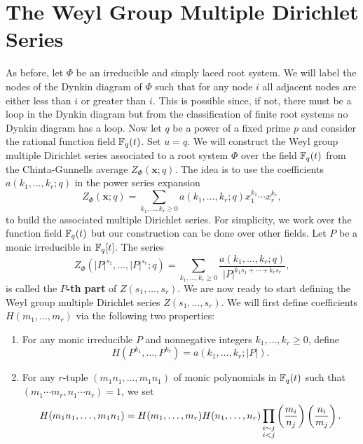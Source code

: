 \documentclass[12pt,reqno,oneside]{amsart}
\begin{document}
\section{The Weyl Group Multiple Dirichlet Series}
    As before, let $\Phi$ be an irreducible and simply laced root system. We will label the nodes of the Dynkin diagram of $\Phi$ such that for any node $i$ all adjacent nodes are either less than $i$ or greater than $i$. This is possible since, if not, there must be a loop in the Dynkin diagram but from the classification of finite root systems no Dynkin diagram has a loop. Now let $q$ be a power of a fixed prime $p$ and consider the rational function field $\mathbb{F}_{q}(t)$. Set $u = q$. We will construct the Weyl group multiple Dirichlet series associated to a root system $\Phi$ over the field $\mathbb{F}_{q}(t)$ from the Chinta-Gunnells average $Z_{\Phi}(\mathbf{x};q)$. The idea is to use the coefficients $a(k_{1},\ldots,k_{r};q)$ in the power series expansion
    \[
        Z_{\Phi}(\mathbf{x};q) = \sum_{k_{1},\ldots,k_{r} \ge 0}a(k_{1},\ldots,k_{r};q)x_{1}^{k_{1}} \cdots x_{r}^{k_{r}},
    \]
    to build the associated multiple Dirichlet series. For simplicity, we work over the function field $\mathbb{F}_{q}(t)$ but our construction can be done over other fields. Let $P$ be a monic irreducible in $\mathbb{F}_{q}[t]$. The series
    \[
        Z_{\Phi}(|P|^{s_{1}},\ldots,|P|^{s_{r}};q) = \sum_{k_{1},\ldots,k_{r} \ge 0}\frac{a(k_{1},\ldots,k_{r};q)}{|P|^{k_{1}s_{1}+\cdots+k_{r}s_{r}}},
    \]
    is called the \textbf{$P$-th part} of $Z(s_{1},\ldots,s_{r})$. We are now ready to start defining the Weyl group multiple Dirichlet series $Z(s_{1},\ldots,s_{r})$. We will first define coefficients $H(m_{1},\ldots,m_{r})$ via the following two properties:
    \begin{enumerate}[label=(\roman*)]
        \item For any monic irreducible $P$ and nonnegative integers $k_{1},\ldots,k_{r} \ge 0$, define
        \[
            H(P^{k_{1}},\ldots,P^{k_{r}}) = a(k_{1},\ldots,k_{r};|P|).
        \]
        \item For any $r$-tuple $(m_{1}n_{1},\ldots,m_{1}n_{1})$ of monic polynomials in $\mathbb{F}_{q}(t)$ such that $(m_{1} \cdots m_{r},n_{1} \cdots n_{r}) = 1$, we set
        \[
            H(m_{1}n_{1},\ldots,m_{1}n_{1}) = H(m_{1},\ldots,m_{r})H(n_{1},\ldots,n_{r})\prod_{\substack{i \sim j \\ i < j}}\left(\frac{m_{i}}{n_{j}}\right)\left(\frac{n_{i}}{m_{j}}\right).
        \]
    \end{enumerate}
\end{document}
